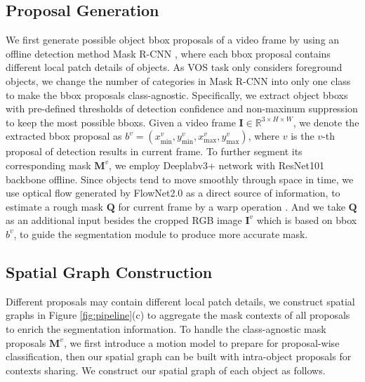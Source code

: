 \documentclass[letterpaper]{article} %
\begin{document}
\subsection{Proposal Generation}
We first generate possible object bbox proposals of a video frame by using an offline detection method Mask R-CNN \cite{he2017mask}, where each bbox proposal contains different local patch details of objects. As VOS task only considers foreground objects, we change the number of categories in Mask R-CNN into only one class to make the bbox proposals class-agnostic. Specifically, we extract object bboxs with pre-defined thresholds of detection confidence and non-maxinum suppression to keep the most possible bboxs. Given a video frame $\bm{I} \in \mathbb{R}^{3 \times H\times W}$, we denote the extracted bbox proposal as $b^v = (x_{\text{min}}^v, y_{\text{min}}^v, x_{\text{max}}^v, y_{\text{max}}^v)$, where $v$ is the $v$-th proposal of detection results in current frame.
To further segment its corresponding mask $\bm{M}^v$, we employ Deeplabv3+ \cite{chen2018encoder} network with ResNet101 \cite{he2016deep} backbone offline. 
Since objects tend to move smoothly through space in time, we use optical flow generated by FlowNet2.0 \cite{ilg2017flownet} as a direct source of information, to estimate a rough mask $\bm{Q}$ for current frame by a warp operation \cite{khoreva2017lucid}. And we take $\bm{Q}$ as an additional input besides the cropped RGB image $\bm{I}^v$ which is based on bbox $b^v$, to guide the segmentation module to produce more accurate mask.

\subsection{Spatial Graph Construction}
Different proposals may contain different local patch details, we construct spatial graphs in Figure \ref{fig:pipeline}(c) to aggregate the mask contexts of all proposals to enrich the segmentation information. To handle the class-agnostic mask proposals $\bm{M}^v$, we first introduce a motion model to prepare for proposal-wise classification, then our spatial graph can be built with intra-object proposals for contexts sharing. We construct our spatial graph of each object as follows.
\end{document}
